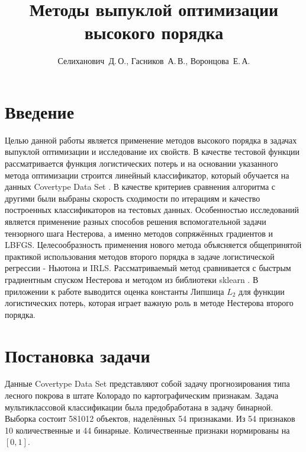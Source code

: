 \documentclass[12pt,twoside]{article}
\title
[Методы выпуклой оптимизации высокого порядка] %
{Методы выпуклой оптимизации высокого порядка}
\author
[Селиханович~Д.\,О.$^{1, 2}$, Гасников~А.\,В.$^{1, 2}$, Воронцова~Е.\,А.$^{3}$] %
{Селиханович~Д.\,О., Гасников~А.\,В., Воронцова~Е.\,А.} %
[Селиханович~Д.\,О.$^{1, 2}$, Гасников~А.\,В.$^{1, 2}$, Воронцова~Е.\,А.$^{3}$] %
\begin{document}
	\maketitle
	
	\section{Введение}
	Целью данной работы является применение методов высокого порядка \cite{nesterov2018implementable} в задачах выпуклой оптимизации и исследование их свойств. В качестве тестовой функции рассматривается функция логистических потерь и на основании указанного метода оптимизации строится линейный классификатор, который обучается на данных Covertype Data Set \cite{blackard1999comparative}. В качестве критериев сравнения алгоритма с другими были выбраны скорость сходимости по итерациям и качество построенных классификаторов на тестовых данных. Особенностью исследований является применение разных способов решения вспомогательной задачи тензорного шага Нестерова, а именно методов сопряжённых градиентов и LBFGS. Целесообразность применения нового метода объясняется общепринятой практикой использования методов второго порядка в задаче логистической регрессии - Ньютона и IRLS. Рассматриваемый метод сравнивается с быстрым градиентным спуском Нестерова \cite{rodomanov} и методом из библиотеки sklearn \cite{fan2008liblinear}. В приложении к работе выводится оценка константы Липшица $L_2$ для функции логистических потерь, которая играет важную роль в методе Нестерова второго порядка.
	\section{Постановка задачи}
	Данные Covertype Data Set \cite{blackard1999comparative} представляют собой задачу прогнозирования типа лесного покрова в штате Колорадо по картографическим признакам. Задача мультиклассовой классификации была предобработана в задачу бинарной. Выборка состоит 581012 объектов, наделённых 54 признаками. Из 54 признаков 10 количественные и 44 бинарные. Количественные признаки нормированы на $[0, 1]$.
	
\end{document}
